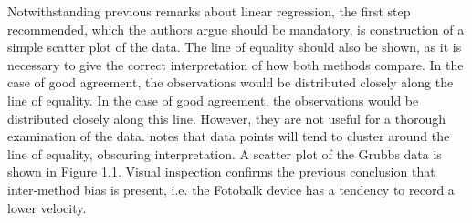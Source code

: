 \documentclass[12pt, a4paper]{report}
\theoremstyle{plain}
\theoremstyle{definition}
\theoremstyle{remark}
\begin{document}
	
	Notwithstanding previous remarks about linear regression, the first step recommended, which the authors argue should be mandatory, is construction of a simple scatter plot of the data. The line of equality should also be shown, as it is necessary to give the correct interpretation of how both methods compare. In the case of good agreement, the observations would be distributed closely along the line of equality. In the case of good agreement, the observations would be distributed closely along this line. However, they are not useful for a thorough examination of the data. \citet{BritHypSoc} notes that data points will tend to cluster around the line of equality, obscuring interpretation. A scatter plot of the Grubbs data is shown in Figure 1.1. Visual inspection confirms the previous conclusion that inter-method bias is present, i.e. the Fotobalk device has a tendency to record a lower velocity.
	
\end{document}
